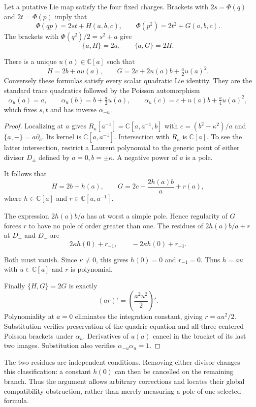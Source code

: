 Let a putative Lie map satisfy the four fixed charges. Brackets with
$2s=\Phi(q)$ and $2t=\Phi(p)$ imply that
\[
 \Phi(qp)=2st+H(a,b,c),\qquad
 \Phi(p^2)=2t^2+G(a,b,c).
\]
The brackets with $\Phi(q^2)/2=s^2+a$ give
\[
 \{a,H\}=2a,\qquad\{a,G\}=2H.
\]

\begin{lemma}\label{mht:frgl:lem:global-shears}
There is a unique $u(a)\in\mathbb C[a]$ such that
\[
 H=2b+a u(a),\qquad
 G=2c+2u(a)b+\tfrac a2u(a)^2.
\]
Conversely these formulas satisfy every scalar quadratic Lie
identity. They are the standard trace quadratics followed by the
Poisson automorphism
\[
 \alpha_u(a)=a,\qquad
 \alpha_u(b)=b+\tfrac a2u(a),\qquad
 \alpha_u(c)=c+u(a)b+\tfrac a4u(a)^2,
\]
which fixes $s,t$ and has inverse $\alpha_{-u}$.
\end{lemma}

\begin{proof}
Localizing at $a$ gives
$R_\kappa[a^{-1}]=\mathbb C[a,a^{-1},b]$ with
$c=(b^2-\kappa^2)/a$ and $\{a,-\}=a\partial_b$.
Its kernel is $\mathbb C[a,a^{-1}]$. Intersection with $R_\kappa$
is $\mathbb C[a]$. To see the latter intersection, restrict a Laurent
polynomial to the generic point of either divisor $D_\pm$
defined by $a=0,b=\pm\kappa$. A negative power of $a$ is a pole.

It follows that
\[
 H=2b+h(a),\qquad
 G=2c+\frac{2h(a)b}{a}+r(a),
\]
where $h\in\mathbb C[a]$ and $r\in\mathbb C[a,a^{-1}]$.

The expression $2h(a)b/a$ has at worst a simple pole. Hence
regularity of $G$ forces $r$ to have no pole of order greater
than one. The residues of $2h(a)b/a+r$ at $D_+$ and $D_-$ are
\[
 2\kappa h(0)+r_{-1},\qquad
 -2\kappa h(0)+r_{-1}.
\]

Both must vanish. Since $\kappa\ne0$, this gives $h(0)=0$ and
$r_{-1}=0$. Thus $h=au$ with $u\in\mathbb C[a]$ and $r$ is
polynomial.

Finally $\{H,G\}=2G$ is exactly
\[
 (ar)'=\left(\frac{a^2u^2}{2}\right)'.
\]
Polynomiality at $a=0$ eliminates the integration constant, giving
$r=au^2/2$.
Substitution verifies preservation of the quadric
equation and all three centered Poisson brackets under $\alpha_u$. Derivatives of $u(a)$ cancel in the bracket of its last two
images. Substitution also verifies $\alpha_{-u}\alpha_u=1$.
\end{proof}

The two residues are independent conditions. Removing either
divisor changes this classification: a constant $h(0)$ can then
be cancelled on the remaining branch. Thus the argument allows
arbitrary corrections and locates their global compatibility
obstruction, rather than merely measuring a pole of one selected
formula.

